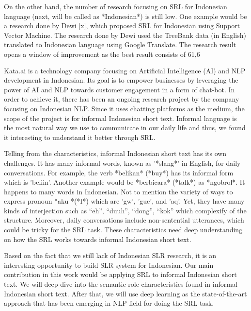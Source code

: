 	On the other hand, the number of research focusing on SRL for Indonesian language (next, will be called as *Indonesian*) is still low. One example would be a research done by Dewi [x], which proposed SRL for Indonesian using Support Vector Machine. The research done by Dewi used the TreeBank data (in English) translated to Indonesian language using Google Translate. The research result opens a window of improvement as the best result consists of 61,6%
	
	Kata.ai is a technology company focusing on Artificial Intelligence (AI) and NLP development in Indonesian. Its goal is to empower businesses by leveraging the power of AI and NLP towards customer engagement in a form of chat-bot. In order to achieve it, there has been an ongoing research project by the company focusing on Indonesian NLP. Since it uses chatting platforms as the medium, the scope of the project is for informal Indonesian short text. Informal language is the most natural way we use to communicate in our daily life and thus, we found it interesting to understand it better through SRL.
	
	Telling from the characteristics, informal Indonesian short text has its own challenges. It has many informal words, known as '*slang*' in English, for daily conversations. For example, the verb *belikan* (*buy*) has its informal form which is 'beliin'. Another example would be *berbicara* (*talk*) as *ngobrol*. It happens to many words in Indonesian. Not to mention the variety of ways to express pronoun *aku *(*I*) which are 'gw', 'gue', and 'aq'. Yet, they have many kinds of interjection such as “eh”, “duuh”, “dong”, “kok” which complexify of the structure. Moreover, daily conversations include non-sentential utterances, which could be tricky for the SRL task. These characteristics need deep understanding on how the SRL works towards informal Indonesian short text.
	
	Based on the fact that we still lack of Indonesian SLR research, it is an interesting opportunity to build SLR system for Indonesian. Our main contribution in this work would be applying SRL to informal Indonesian short text. We will deep dive into the semantic role characteristics found in informal Indonesian short text. After that, we will use deep learning as the state-of-the-art approach that has been emerging in NLP field for doing the SRL task.
	
